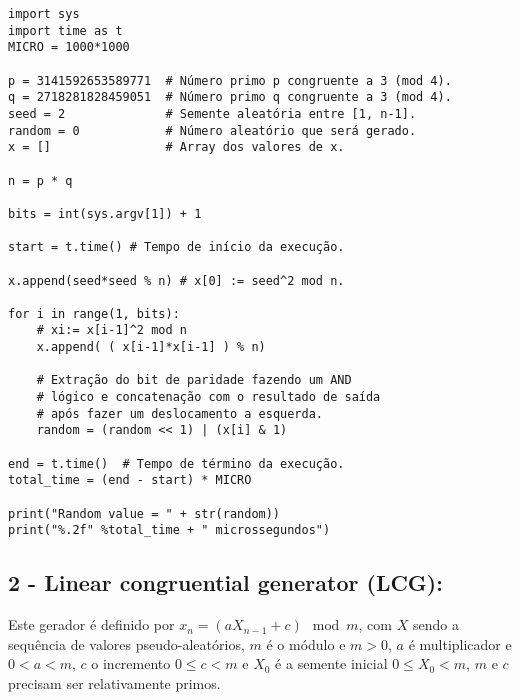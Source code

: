 \documentclass[
    article,            %
    11pt,               %
    oneside,            %
    a4paper,            %
    english,            %
    brazil,             %
    sumario=tradicional,
    ]{abntex2}
\begin{document}
\begin{lstlisting}[frame=single, title={blum-blum-shub.py}]
import sys
import time as t
MICRO = 1000*1000

p = 3141592653589771  # Número primo p congruente a 3 (mod 4).
q = 2718281828459051  # Número primo q congruente a 3 (mod 4).
seed = 2              # Semente aleatória entre [1, n-1].
random = 0            # Número aleatório que será gerado.
x = []                # Array dos valores de x.

n = p * q

bits = int(sys.argv[1]) + 1

start = t.time() # Tempo de início da execução.

x.append(seed*seed % n) # x[0] := seed^2 mod n.

for i in range(1, bits):
    # xi:= x[i-1]^2 mod n
    x.append( ( x[i-1]*x[i-1] ) % n)

    # Extração do bit de paridade fazendo um AND
    # lógico e concatenação com o resultado de saída
    # após fazer um deslocamento a esquerda.
    random = (random << 1) | (x[i] & 1)

end = t.time()  # Tempo de término da execução.
total_time = (end - start) * MICRO

print("Random value = " + str(random))
print("%.2f" %total_time + " microssegundos")
\end{lstlisting}

\subsection*{\textbf{2 - Linear congruential generator (LCG):}}

Este gerador é definido por $x_{n} = (aX_{n-1} + c)\mod m$, com $X$ sendo a sequência de valores pseudo-aleatórios, $m$ é o módulo e $m > 0$, $a$ é multiplicador e $0 < a < m$, $c$ o incremento $0\leq c<m$ e $X_0$ é a semente inicial $0 \leq X_0 < m$, $m$ e $c$ precisam ser relativamente primos.
\end{document}
